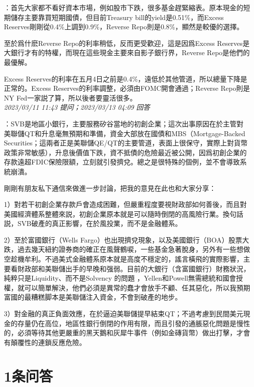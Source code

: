 \documentclass[twocolumn]{ctexart}
\begin{document}
：首先大家都不看好資本市場，例如股市下跌，很多基金趕緊縮表。原本現金的短期儲存主要靠買短期國債，但目前Treasury bill的yield是0.51\%，而Excess Reserves剛剛從0.4\%上調到0.9\%，Reverse Repo則是0.8\%，顯然是較優的選擇。

至於爲什麽Reverse Repo的利率稍低，反而更受歡迎，這是因爲Excess Reserves是大銀行才有的特權，而現在這些現金主要來自影子銀行界，Reverse Repo是他們的最優解。

Excess Reserves的利率在五月4日之前是0.4\%，遠低於其他管道，所以總量下降是正常的。Excess Reserves的利率調整，必須由FOMC開會通過；Reverse Repo則是NY Fed一家説了算，所以後者要靈活很多。
\\

\textit{\hfill\noindent\small 2023/03/11 11:43 提问；2023/03/13 04:09 回答}

：SVB是地區小銀行，主要服務矽谷當地的初創企業；這次出事原因在於主管對美聯儲QT和升息毫無預期和準備，資金大部放在國債和MBS（Mortgage-Backed Securities；這兩者正是美聯儲QE/QT的主要管道，表面上很保守，實際上對貨幣政策非常敏感），升息後價值下跌，資不抵債的危險最近被公開，因爲初創企業的存款遠超FDIC保險限額，立刻就引發擠兌。總之是很特殊的個例，並不會導致系統崩潰。


剛剛有朋友私下通信來做進一步討論，把我的意見在此也和大家分享：

1）對若干初創企業存款戶會造成困難，但嚴重程度要視財政部如何善後，而且對美國經濟體系整體來説，初創企業原本就是可以隨時倒閉的高風險行業。換句話説，SVB破產的真正影響，在於風投業，而不是金融體系。

2）至於富國銀行（Wells Fargo）也出現擠兌現象，以及美國銀行（BOA）股票大跌，過去幾天紐約證券商的確正在風聲鶴唳，一些基金急著脫身，另外有一些想做空趁機牟利。不過美式金融體系原本就是高度不穩定的，謠言橫飛的實際影響，主要看財政部和美聯儲出手的早晚和强弱。目前的大銀行（含富國銀行）財務狀況，純粹只是Liquidity、而不是Solvency 的問題 ，Yellen和Powell無需總統和國會授權，就可以簡單解決，他們必須是異常的蠢才會放手不顧、任其惡化，所以我預期富國的最糟糕脚本是美聯儲注入資金，不會到破產的地步。

3）對金融的真正負面效應，在於逼迫美聯儲提早結束QT；不過考慮到民間美元現金的存量仍在高位，地區性銀行倒閉的作用有限，而且引發的通脹惡化問題是慢性的，必須等待其他更嚴重的黑天鵝和灰犀牛事件（例如金磚貨幣）做出打擊，才會有顛覆性的連鎖反應危險。
\\

\section{1条问答}
\end{document}
